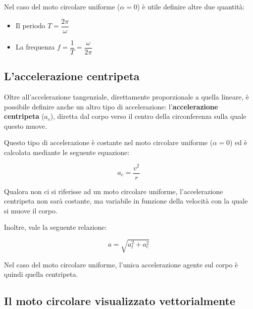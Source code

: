 \documentclass[oneside]{book}
\begin{document}
Nel caso del moto circolare uniforme ($\alpha=0$) è utile definire
altre due quantità:

\begin{itemize}
    \item Il periodo $T=\dfrac{2\pi}{\omega}$
    \item La frequenza $f=\dfrac{1}{T}=\dfrac{\omega}{2\pi}$
\end{itemize}

\subsection{L'accelerazione centripeta}

Oltre all'accelerazione tangenziale, direttamente proporzionale a
quella lineare, è possibile definire anche un altro tipo di
accelerazione: l'\textbf{accelerazione centripeta} ($a_c$), diretta dal
corpo verso il centro della circonferenza sulla quale questo muove.

Questo tipo di accelerazione è costante nel moto circolare uniforme
($\alpha=0$) ed è calcolata mediante le seguente equazione:

\begin{equation}
    a_c=\frac{v^2}{r}
    \label{eq:acc_c}
\end{equation}

Qualora non ci si riferisse ad un moto circolare uniforme,
l'accelerazione centripeta non sarà costante, ma variabile in
funzione della velocità con la quale si muove il corpo.

Inoltre, vale la seguente relazione:

\begin{equation}
    a=\sqrt{a_t^2 + a_c^2}
    \label{eq:acc_moto_cir}
\end{equation}

Nel caso del moto circolare uniforme, l'unica
accelerazione agente sul corpo è quindi quella centripeta.

\newpage

\subsection{Il moto circolare visualizzato vettorialmente}

\vskip 0.1in
\end{document}
